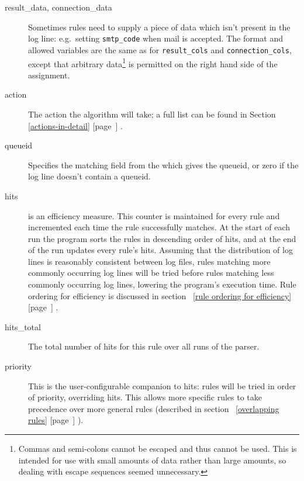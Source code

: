 \documentclass[a4paper,12pt,draft]{article}
\newcommand{\refwithpage}[1]{%
    \empty{}\ref{#1} [page~\pageref{#1}]%
}
\begin{document}
\begin{description}
    \item [result\_data, connection\_data] Sometimes rules need to supply a
        piece of data which isn't present in the log line: e.g.\ setting
        \texttt{smtp\_code} when mail is accepted.  The format and allowed
        variables are the same as for \texttt{result\_cols} and
        \texttt{connection\_cols}, except that arbitrary
        data\footnote{Commas and semi-colons cannot be escaped and thus
        cannot be used.  This is intended for use with small amounts of
        data rather than large amounts, so dealing with escape sequences
        seemed unnecessary.} is permitted on the right hand side of the
        assignment.

    \item [action] The action the algorithm will take; a full list can be
        found in Section~\refwithpage{actions-in-detail}.

    \item [queueid] Specifies the matching field from the \regex{} which
        gives the queueid, or zero if the log line doesn't contain a
        queueid.

    \item [hits] is an efficiency measure.  This counter is maintained for
        every rule and incremented each time the rule successfully matches.
        At the start of each run the program sorts the rules in descending
        order of hits, and at the end of the run updates every rule's hits.
        Assuming that the distribution of log lines is reasonably
        consistent between log files, rules matching more commonly
        occurring log lines will be tried before rules matching less
        commonly occurring log lines, lowering the program's execution
        time.  Rule ordering for efficiency is discussed in
        section~\refwithpage{rule ordering for efficiency}.

    \item [hits\_total] The total number of hits for this rule over all
        runs of the parser.

    \item [priority] This is the user-configurable companion to hits: rules
        will be tried in order of priority, overriding hits.  This allows
        more specific rules to take precedence over more general rules
        (described in section~\refwithpage{overlapping rules}).

\end{description}
\end{document}
